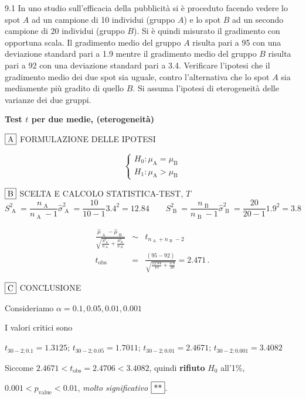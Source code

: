\documentclass[
  11pt,
]{book}
\theoremstyle{mytheoremstyle}
\theoremstyle{mydefstyle}
\newenvironment{sol}
  {
  \begin{tcolorbox}[enhanced,breakable,arc=0.1mm,boxrule=1pt,colback=white,colframe=iblue,
  title=\bf \fontfamily{lmss}\selectfont \hspace{.5 cm} Soluzione,drop fuzzy shadow]

}{
\end{tcolorbox}
  }
\begin{document}
9.1 In uno studio sull'efficacia della pubblicità
si è proceduto facendo vedere lo spot \(A\) ad un campione di 10
individui (gruppo \(A\)) e lo spot \(B\) ad un secondo campione di 20
individui (gruppo \(B\)).
Si è quindi misurato il gradimento con opportuna scala.
Il gradimento medio del gruppo \(A\) risulta pari a 95 con una
deviazione standard pari a 1.9 mentre il gradimento medio del
gruppo \(B\) risulta pari a 92 con una deviazione standard pari
a 3.4.
Verificare l'ipotesi che il gradimento medio dei due spot sia uguale, contro
l'alternativa che lo spot \(A\) sia mediamente più gradito
di quello \(B\).
Si assuma l'ipotesi di eterogeneità delle varianze dei due
gruppi.

\begin{sol}
\textbf{Test \(t\) per due medie, (eterogeneità)}

\(\fbox{A}\) FORMULAZIONE DELLE IPOTESI

\[\begin{cases}
   H_0: \mu_\text{A} = \mu_\text{B} \\
   H_1: \mu_\text{A} > \mu_\text{B} 
   \end{cases}\]

\(\fbox{B}\) SCELTA E CALCOLO STATISTICA-TEST, \(T\)
\[
     S^2_\text{ A }=\frac{n_\text{ A }}{n_\text{ A }-1}\hat\sigma^2_\text{ A }=\frac{ 10 }{ 10 -1} 3.4 ^2= 12.84  \qquad
     S^2_\text{ B }=\frac{n_\text{ B }}{n_\text{ B }-1}\hat\sigma^2_\text{ B }=\frac{ 20 }{ 20 -1} 1.9 ^2= 3.8 
   \]

\begin{eqnarray*}
   \frac{\hat\mu_\text{ A } - \hat\mu_\text{ B }}
   {\sqrt{\frac {S^2_\text{ A }}{n_\text{ A }}+\frac {S^2_\text{ B }}{n_\text{ B }}}}&\sim&t_{n_\text{ A }+n_\text{ B }-2}\\
   t_{\text{obs}}
   &=& \frac{ ( 95 -  92 )} {\sqrt{\frac{ 12.84 }{ 10 }+\frac{ 3.8 }{ 20 }}}
   =   2.471 \, .
   \end{eqnarray*}

\(\fbox{C}\) CONCLUSIONE

Consideriamo \(\alpha=0.1, 0.05, 0.01, 0.001\)

I valori critici sono

\(t_{30-2;0.1}=1.3125\); \(t_{30-2;0.05}=1.7011\); \(t_{30-2;0.01}=2.4671\); \(t_{30-2;0.001}=3.4082\)

Siccome \(2.4671<t_\text{obs}=2.4706<3.4082\), quindi \textbf{rifiuto} \(H_0\) all'1\%,

\(0.001<p_\text{value}<0.01\), \emph{molto significativo} \(\fbox{**}\).


\end{sol}
\end{document}
